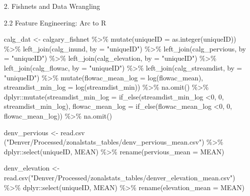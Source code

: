 \documentclass[
  ignorenonframetext,
]{beamer}
\newenvironment{Shaded}{\begin{snugshade}}{\end{snugshade}}
\newcommand{\AttributeTok}[1]{\textcolor[rgb]{0.77,0.63,0.00}{#1}}
\newcommand{\DecValTok}[1]{\textcolor[rgb]{0.00,0.00,0.81}{#1}}
\newcommand{\FunctionTok}[1]{\textcolor[rgb]{0.00,0.00,0.00}{#1}}
\newcommand{\NormalTok}[1]{#1}
\newcommand{\OtherTok}[1]{\textcolor[rgb]{0.56,0.35,0.01}{#1}}
\newcommand{\SpecialCharTok}[1]{\textcolor[rgb]{0.00,0.00,0.00}{#1}}
\newcommand{\StringTok}[1]{\textcolor[rgb]{0.31,0.60,0.02}{#1}}
\begin{document}
\begin{frame}[fragile]{2. Fishnets and Data Wrangling}
\begin{block}{2.2 Feature Engineering: Arc to R}
\begin{Shaded}
\begin{Highlighting}[]
\NormalTok{calg\_dat }\OtherTok{\textless{}{-}}\NormalTok{ calgary\_fishnet }\SpecialCharTok{\%\textgreater{}\%}
  \FunctionTok{mutate}\NormalTok{(}\AttributeTok{uniqueID =} \FunctionTok{as.integer}\NormalTok{(uniqueID)) }\SpecialCharTok{\%\textgreater{}\%} 
  \FunctionTok{left\_join}\NormalTok{(calg\_inund, }\AttributeTok{by =} \StringTok{"uniqueID"}\NormalTok{) }\SpecialCharTok{\%\textgreater{}\%} 
  \FunctionTok{left\_join}\NormalTok{(calg\_pervious, }\AttributeTok{by =} \StringTok{"uniqueID"}\NormalTok{) }\SpecialCharTok{\%\textgreater{}\%}
  \FunctionTok{left\_join}\NormalTok{(calg\_elevation, }\AttributeTok{by =} \StringTok{"uniqueID"}\NormalTok{) }\SpecialCharTok{\%\textgreater{}\%} 
  \FunctionTok{left\_join}\NormalTok{(calg\_flowac, }\AttributeTok{by =} \StringTok{"uniqueID"}\NormalTok{) }\SpecialCharTok{\%\textgreater{}\%} 
  \FunctionTok{left\_join}\NormalTok{(calg\_streamdist, }\AttributeTok{by =} \StringTok{"uniqueID"}\NormalTok{) }\SpecialCharTok{\%\textgreater{}\%} 
  \FunctionTok{mutate}\NormalTok{(}\AttributeTok{flowac\_mean\_log =} \FunctionTok{log}\NormalTok{(flowac\_mean),}
         \AttributeTok{streamdist\_min\_log =} \FunctionTok{log}\NormalTok{(streamdist\_min)) }\SpecialCharTok{\%\textgreater{}\%} 
  \FunctionTok{na.omit}\NormalTok{() }\SpecialCharTok{\%\textgreater{}\%} 
\NormalTok{    dplyr}\SpecialCharTok{::}\FunctionTok{mutate}\NormalTok{(}\AttributeTok{streamdist\_min\_log =} \FunctionTok{if\_else}\NormalTok{(streamdist\_min\_log }\SpecialCharTok{\textless{}}\DecValTok{0}\NormalTok{, }\DecValTok{0}\NormalTok{, streamdist\_min\_log),}
         \AttributeTok{flowac\_mean\_log =} \FunctionTok{if\_else}\NormalTok{(flowac\_mean\_log }\SpecialCharTok{\textless{}}\DecValTok{0}\NormalTok{, }\DecValTok{0}\NormalTok{, flowac\_mean\_log)) }\SpecialCharTok{\%\textgreater{}\%} 
  \FunctionTok{na.omit}\NormalTok{()}
\end{Highlighting}
\end{Shaded}

\begin{Shaded}
\begin{Highlighting}[]
\NormalTok{denv\_pervious }\OtherTok{\textless{}{-}} \FunctionTok{read.csv}\NormalTok{ (}\StringTok{"Denver/Processed/zonalstats\_tables/denv\_pervious\_mean.csv"}\NormalTok{) }\SpecialCharTok{\%\textgreater{}\%} 
\NormalTok{  dplyr}\SpecialCharTok{::}\FunctionTok{select}\NormalTok{(uniqueID, MEAN) }\SpecialCharTok{\%\textgreater{}\%} 
  \FunctionTok{rename}\NormalTok{(}\AttributeTok{pervious\_mean =}\NormalTok{ MEAN)}

\NormalTok{denv\_elevation }\OtherTok{\textless{}{-}} \FunctionTok{read.csv}\NormalTok{(}\StringTok{"Denver/Processed/zonalstats\_tables/denver\_elevation\_mean.csv"}\NormalTok{) }\SpecialCharTok{\%\textgreater{}\%} 
\NormalTok{  dplyr}\SpecialCharTok{::}\FunctionTok{select}\NormalTok{(uniqueID, MEAN) }\SpecialCharTok{\%\textgreater{}\%} 
  \FunctionTok{rename}\NormalTok{(}\AttributeTok{elevation\_mean =}\NormalTok{ MEAN)}



\end{Highlighting}
\end{Shaded}
\end{block}
\end{frame}
\end{document}

